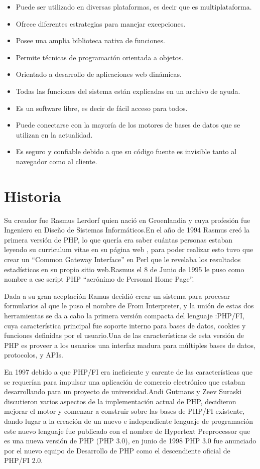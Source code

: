 \documentclass[11pt]{article} %
\begin{document}
\begin{itemize}
\item Puede ser utilizado  en diversas plataformas, es decir que es multiplataforma.
\item Ofrece diferentes estrategias para manejar excepciones.
\item Posee una amplia biblioteca nativa de funciones.
\item Permite técnicas de programación orientada a objetos.
\item Orientado a desarrollo de aplicaciones web dinámicas.
\item Todas las funciones del sistema están explicadas en un  archivo de ayuda.
\item Es un software libre, es decir de fácil acceso para todos.
\item Puede conectarse con la mayoría de los motores de bases de datos que se utilizan en la actualidad.
\item Es seguro y confiable debido a que su código fuente es invisible tanto al navegador como al cliente.
\end {itemize}

\section{Historia}

Su creador fue  Rasmus  Lerdorf  quien nació en  Groenlandia  y cuya  profesión fue Ingeniero en Diseño de Sistemas Informáticos.En el año de 1994 Rasmus creó la primera versión de PHP, lo que quería era saber cuántas personas estaban leyendo su curriculum vitae en 
su página web , para poder realizar esto tuvo que crear  un   “Common Gateway Interface” en  Perl  que le revelaba  los resultados estadísticos en su propio sitio web.Rasmus el 8 de Junio de 1995 le puso como nombre a ese script PHP  “acrónimo de Personal Home Page”.

Dada a su gran aceptación Ramus decidió crear  un sistema para procesar formularios al que le puso el nombre de From Interpreter, y la unión de estas dos herramientas  se da  a cabo  la primera versión compacta del lenguaje :PHP/FI, cuya característica principal fue soporte interno para bases de datos, cookies y funciones definidas por el usuario.Una de las características de esta versión de PHP es proveer a los usuarios  una interfaz madura para múltiples bases de datos, protocolos, y APIs.

En 1997 debido a que PHP/FI era ineficiente y carente de las características que se requerían para impulsar una aplicación de comercio electrónico que estaban desarrollando para un proyecto de universidad.Andi Gutmans y Zeev Suraski discutieron varios aspectos de la implementación actual de PHP, decidieron mejorar el motor y comenzar a construir sobre las bases de PHP/FI existente, dando lugar a la creación de un nuevo e independiente lenguaje de programación este nuevo lenguaje fue publicado con el nombre de Hypertext  Preprocessor que es una nueva versión de PHP (PHP 3.0), en junio de 1998  PHP 3.0 fue anunciado por el nuevo equipo de Desarrollo de PHP como el descendiente oficial de PHP/FI 2.0.
\end{document}
